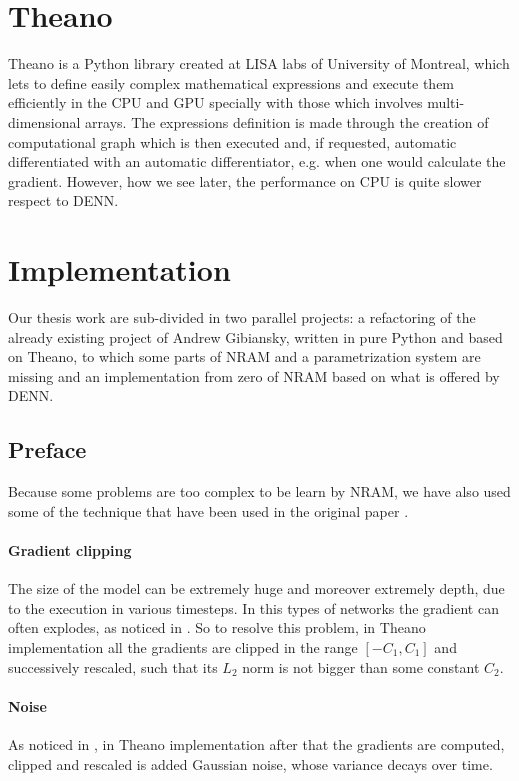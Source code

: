 \section{Theano}
Theano is a Python library created at LISA labs of University of Montreal, which lets to define easily complex mathematical expressions and execute them efficiently in the CPU and GPU specially with those which involves multi-dimensional arrays. The expressions definition is made through the creation of computational graph which is then executed and, if requested, automatic differentiated with an automatic differentiator, e.g. when one would calculate the gradient. However, how we see later, the performance on CPU is quite slower respect to DENN. %

\section{Implementation}
Our thesis work are sub-divided in two parallel projects: a refactoring of the already existing project of Andrew Gibiansky, written in pure Python and based on Theano, to which some parts of NRAM and a parametrization system are missing and an implementation from zero of NRAM based on what is offered by DENN.

\subsection{Preface}
Because some problems are too complex to be learn by NRAM, we have also used some of the technique that have been used in the original paper \cite{NRAM:2016}.

\paragraph{Gradient clipping}
The size of the model can be extremely huge and moreover extremely depth, due to the execution in various timesteps. In this types of networks the gradient can often explodes, as noticed in \cite{Bengio1994LearningLD}. So to resolve this problem, in Theano implementation all the gradients are clipped in the range $[-C_1, C_1]$ and successively rescaled, such that its $L_2$ norm is not bigger than some constant $C_2$.

\paragraph{Noise}
As noticed in \cite{Neelakantan2015AddingGN}, in Theano implementation after that the gradients are computed, clipped and rescaled is added Gaussian noise, whose variance decays over time.

